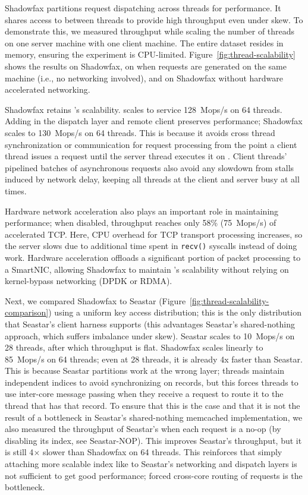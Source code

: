 Shadowfax partitions request dispatching across threads for
performance.
%
It shares access to \faster between threads to provide high
throughput even under skew.
%
To demonstrate this, we measured throughput while scaling the number of threads
on one server machine with one client machine.
%
The entire dataset resides in memory, ensuring the experiment is CPU-limited.
%
Figure~\ref{fig:thread-scalability} shows the results on Shadowfax, on
\faster when requests are generated on the same machine (i.e., no networking involved), and on Shadowfax without
hardware accelerated networking.

%
Shadowfax retains \faster{}'s scalability.
%
\faster{} scales to service 128~Mops/s on 64 threads.
%
Adding in the dispatch layer and remote client preserves performance;
Shadowfax scales to 130~Mops/s on 64 threads.
%
This is because it avoids cross thread synchronization or communication for
request processing from the point a client thread issues a request until the
server thread executes it on \faster.
%
Client threads' pipelined batches of asynchronous requests also avoid any
slowdown from stalls induced by network delay, keeping all threads at the
client and server busy at all times.

Hardware network acceleration also plays an important role in
maintaining performance; when disabled, throughput reaches only 58\%
(75~Mops/s) of
accelerated TCP.
%
Here, CPU overhead for TCP transport processing increases, so the server
slows due to additional time spent in \texttt{recv()} syscalls instead of doing
work.
%
Hardware acceleration offloads a significant portion of packet processing to a
SmartNIC, allowing Shadowfax to maintain \faster{}'s scalability without
relying on kernel-bypass networking (DPDK or RDMA).

Next, we compared Shadowfax to Seastar
(Figure~\ref{fig:thread-scalability-comparison}) using a uniform key access
distribution; this is the only distribution that Seastar's client harness
supports (this advantages Seastar's shared-nothing approach, which suffers
imbalance under skew).
%
Seastar scales to 10~Mops/s on 28 threads, after which throughput is flat.
%
Shadowfax scales linearly to 85~Mops/s on 64 threads; even at 28 threads, it is
already 4x faster than Seastar.
%
This is because Seastar partitions work at the wrong layer; threads maintain
independent indices to avoid synchronizing on records, but this forces threads
to use inter-core message passing when they receive a request to route it to
the thread that has that record.
%
To ensure that this is the case and that it is not the result of a bottleneck in
Seastar's shared-nothing memcached implementation, we also measured the
throughput of Seastar's when each request is a no-op (by disabling its index,
see Seastar-NOP).
%
This improves Seastar's throughput, but it is still 4$\times{}$ slower
than Shadowfax on 64 threads.
%
This reinforces that simply attaching more scalable index like
\faster to Seastar's networking and dispatch layers is not sufficient to get
good performance; forced cross-core routing of requests is the bottleneck.

